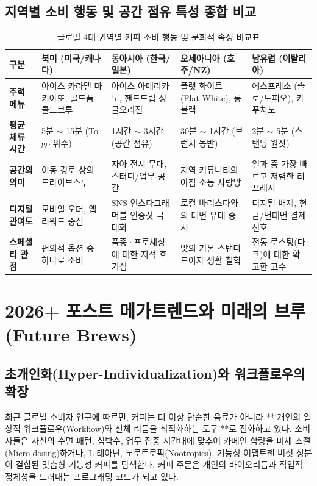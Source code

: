 \documentclass[10pt,a4paper]{article}
\begin{document}
\subsection{지역별 소비 행동 및 공간 점유 특성 종합 비교}

\begin{table}[h!]
\centering
\footnotesize
\caption{글로벌 4대 권역별 커피 소비 행동 및 문화적 속성 비교표}
\vspace{4pt}
\begin{tabularx}{\textwidth}{lXXXX}
\toprule
\textbf{구분} & \textbf{북미 (미국/캐나다)} & \textbf{동아시아 (한국/일본)} & \textbf{오세아니아 (호주/NZ)} & \textbf{남유럽 (이탈리아)} \\
\midrule
\textbf{주력 메뉴} & 아이스 카라멜 마키아또, 콜드폼 콜드브루 & 아이스 아메리카노, 핸드드립 싱글오리진 & 플랫 화이트 (Flat White), 롱 블랙 & 에스프레소 (솔로/도피오), 카푸치노 \\
\textbf{평균 체류 시간} & 5분 $\sim$ 15분 (To-go 위주) & 1시간 $\sim$ 3시간 (공간 점유) & 30분 $\sim$ 1시간 (브런치 동반) & 2분 $\sim$ 5분 (스탠딩 원샷) \\
\textbf{공간의 의미} & 이동 경로 상의 드라이브스루 & 자아 전시 무대, 스터디/업무 공간 & 지역 커뮤니티의 아침 소통 사랑방 & 일과 중 가장 빠르고 저렴한 리프레시 \\
\textbf{디지털 관여도} & 모바일 오더, 앱 리워드 중심 & SNS 인스타그래머블 인증샷 극대화 & 로컬 바리스타와의 대면 유대 중시 & 디지털 배제, 현금/면대면 결제 선호 \\
\textbf{스페셜티 관점} & 편의적 옵션 중 하나로 소비 & 품종·프로세싱에 대한 지적 호기심 & 맛의 기본 스탠다드이자 생활 철학 & 전통 로스팅(다크)에 대한 확고한 고수 \\
\bottomrule
\end{tabularx}
\end{table}

\section{2026+ 포스트 메가트렌드와 미래의 브루 (Future Brews)}

\subsection{초개인화(Hyper-Individualization)와 워크플로우의 확장}
최근 글로벌 소비자 연구에 따르면, 커피는 더 이상 단순한 음료가 아니라 **‘개인의 일상적 워크플로우(Workflow)와 신체 리듬을 최적화하는 도구’**로 진화하고 있다.
소비자들은 자신의 수면 패턴, 심박수, 업무 집중 시간대에 맞추어 카페인 함량을 미세 조절(Micro-dosing)하거나, L-테아닌, 노로트로픽(Nootropics), 기능성 어댑토젠 버섯 성분이 결합된 맞춤형 기능성 커피를 탐색한다. 커피 주문은 개인의 바이오리듬과 직업적 정체성을 드러내는 프로그래밍 코드가 되고 있다.
\end{document}
